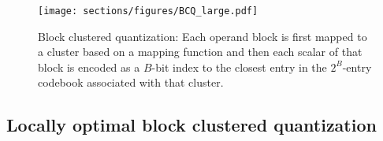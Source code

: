 \begin{figure}
    \centering
    \texttt{[image: sections/figures/BCQ\_large.pdf]}
    \caption{\small Block clustered quantization: Each operand block is first mapped to a cluster based on a mapping function and then each scalar of that block is encoded as a $B$-bit index to the closest entry in the $2^B$-entry codebook associated with that cluster.}
    \label{fig:block_clustering}
\end{figure}




\subsection{Locally optimal block clustered quantization}
\label{subsec:iter_optimbcq}

